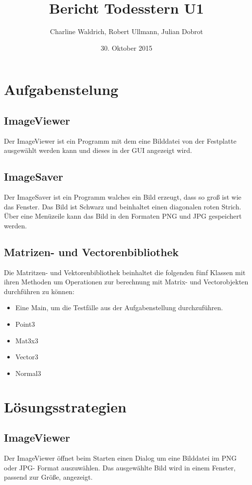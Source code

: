 \documentclass[14pt]{extarticle}
\title{Bericht Todesstern U1}
\author{Charline Waldrich, Robert Ullmann, Julian Dobrot}
\date{30. Oktober 2015}
\begin{document}
\maketitle
\tableofcontents
\pagebreak

\section{Aufgabenstelung}

\subsection{ImageViewer}
Der ImageViewer ist ein Programm mit dem eine Bilddatei von der Festplatte ausgewählt werden kann und dieses in der GUI angezeigt wird. 
\subsection{ImageSaver}
Der ImageSaver ist ein Programm walches ein Bild erzeugt, dass so groß ist wie das Fenster.
Das Bild ist Schwarz und beinhaltet einen diagonalen roten Strich. Über eine Menüzeile kann das Bild in den Formaten PNG und JPG gespeichert werden.
\subsection{Matrizen- und Vectorenbibliothek}
Die Matritzen- und Vektorenbibliothek beinhaltet die folgenden fünf Klassen mit ihren Methoden um Operationen 
zur berechnung mit Matrix- und Vectorobjekten durchführen zu können:

\begin{itemize}
\item Eine Main, um die Testfälle aus der Aufgabenstellung durchzuführen.
\item Point3
\item Mat3x3
\item Vector3 
\item Normal3
\end{itemize}


\section{Lösungsstrategien}
\subsection{ImageViewer}
Der ImageViewer öffnet beim Starten einen Dialog um eine Bilddatei im PNG oder JPG- Format auszuwählen. Das ausgewählte Bild wird in einem Fenster, passend zur Größe, angezeigt.
\end{document}
